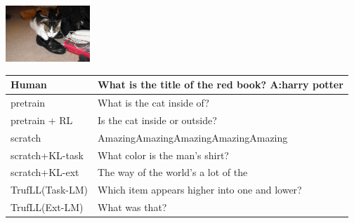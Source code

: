\documentclass{article}
\newcommand{\algo}{TrufLL\xspace}
\begin{document}
\begin{table}[t!]
\begin{minipage}{0.2\linewidth}
		\centering
        \includegraphics[width=120px]{./COCO_val2014_000000090010.jpeg}
	\end{minipage}
	\hspace{1.2cm}
	\begin{minipage}{0.85\linewidth}
	\small
		\scriptsize
		\begin{tabular}{ll}
			\toprule
			Human            & What is the title of the red book?  \quad \textbf{A:harry potter} \\
			\midrule
			pretrain        &  What is the cat inside of? \\
		    pretrain + RL   & Is the cat inside or outside?  \\ \midrule
			scratch         & AmazingAmazingAmazingAmazingAmazing \\
			scratch+KL-task & What color is the man's shirt? \\
			scratch+KL-ext  & The way of the world’s a lot of the \\ \midrule
			\algo(Task-LM)  & Which item appears higher into one and lower? \\
			\algo(Ext-LM)   & What was that? \\
			\bottomrule
		\end{tabular}
	\end{minipage}
	

\end{table}
\end{document}
